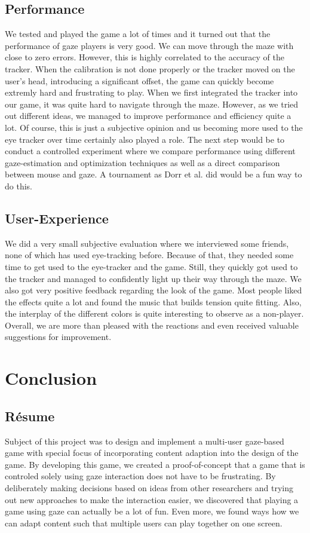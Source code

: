 \documentclass{sigchi}
\begin{document}
\subsection{Performance}
We tested and played the game a lot of times and it turned out that the performance of gaze players is very good. We can move through the maze with close to zero errors. However, this is highly correlated to the accuracy of the tracker. When the calibration is not done properly or the tracker moved on the user's head, introducing a significant offset, the game can quickly become extremly hard and frustrating to play. When we first integrated the tracker into our game, it was quite hard to navigate through the maze. However, as we tried out different ideas, we managed to improve performance and efficiency quite a lot. Of course, this is just a subjective opinion and us becoming more used to the eye tracker over time certainly also played a role. The next step would be to conduct a controlled experiment where we compare performance using different gaze-estimation and optimization techniques as well as a direct comparison between mouse and gaze. A tournament as Dorr et al. \cite{dorr2009gaze} did would be a fun way to do this.

\subsection{User-Experience}
We did a very small subjective evaluation where we interviewed some friends, none of which has used eye-tracking before. Because of that, they needed some time to get used to the eye-tracker and the game. Still, they quickly got used to the tracker and managed to confidently light up their way through the maze. We also got very positive feedback regarding the look of the game. Most people liked the effects quite a lot and found the music that builds tension quite fitting. Also, the interplay of the different colors is quite interesting to observe as a non-player. Overall, we are more than pleased with the reactions and even received valuable suggestions for improvement.

\section{Conclusion}
\subsection{R{\'e}sume}
Subject of this project was to design and implement a multi-user gaze-based game with special focus of incorporating content adaption into the design of the game. By developing this game, we created a proof-of-concept that a game that is controled solely using gaze interaction does not have to be frustrating. By deliberately making decisions based on ideas from other researchers and trying out new approaches to make the interaction easier, we discovered that playing a game using gaze can actually be a lot of fun. Even more, we found ways how we can adapt content such that multiple users can play together on one screen.
\end{document}
